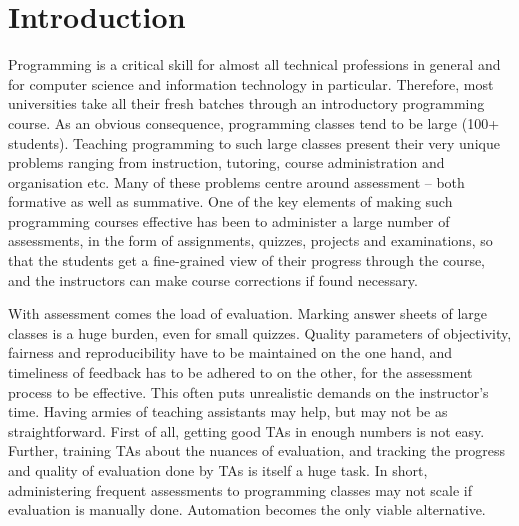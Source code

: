 \documentclass[sigconf]{acmart}
\begin{document}
\section{Introduction}
Programming is a critical skill for almost all technical professions in general and for computer science and information technology in particular. Therefore, most universities take all their fresh batches through an introductory programming course. As an obvious consequence, programming classes tend to be large (100+ students). Teaching programming to such large classes present their very unique problems ranging from instruction, tutoring, course administration and organisation etc. Many of these problems centre around assessment -- both formative as well as summative. One of the key elements of making such programming courses effective has been to administer a large number of assessments, in the form of assignments, quizzes, projects and examinations, so that the students get a fine-grained view of their progress through the course, and the instructors can make course corrections if found necessary.

With assessment comes the load of evaluation. Marking answer sheets of large classes is a huge burden, even for small quizzes. Quality parameters of objectivity, fairness and reproducibility have to be maintained on the one hand, and timeliness of feedback has to be adhered to on the other, for the assessment process to be effective. This often puts unrealistic demands on the instructor's time. Having armies of teaching assistants may help, but may not be as straightforward. First of all, getting good TAs in enough numbers is not easy. Further, training TAs about the nuances of evaluation, and tracking the progress and quality of evaluation done by TAs is itself a huge task. In short, administering frequent assessments to programming classes may not scale if evaluation is manually done. Automation becomes the only viable alternative.
\end{document}
